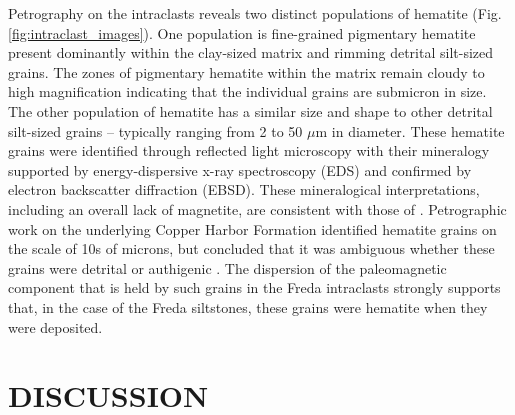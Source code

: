 \documentclass[11pt,letterpaper]{article}
\begin{document}
Petrography on the intraclasts reveals two distinct populations of hematite (Fig. \ref{fig:intraclast_images}). One population is fine-grained pigmentary hematite present dominantly within the clay-sized matrix and rimming detrital silt-sized grains. The zones of pigmentary hematite within the matrix remain cloudy to high magnification indicating that the individual grains are submicron in size. The other population of hematite has a similar size and shape to other detrital silt-sized grains  -- typically ranging from 2 to 50 $\mu$m in diameter. These hematite grains were identified through reflected light microscopy with their mineralogy supported by energy-dispersive x-ray spectroscopy (EDS) and confirmed by electron backscatter diffraction (EBSD). These mineralogical interpretations, including an overall lack of magnetite, are consistent with those of \cite{Vincenz1968b}. Petrographic work on the underlying Copper Harbor Formation identified hematite grains on the scale of 10s of microns, but concluded that it was ambiguous whether these grains were detrital or authigenic \citep{Elmore1982a}. The dispersion of the paleomagnetic component that is held by such grains in the Freda intraclasts strongly supports that, in the case of the Freda siltstones, these grains were hematite when they were deposited. 



\section*{DISCUSSION}
\end{document}
